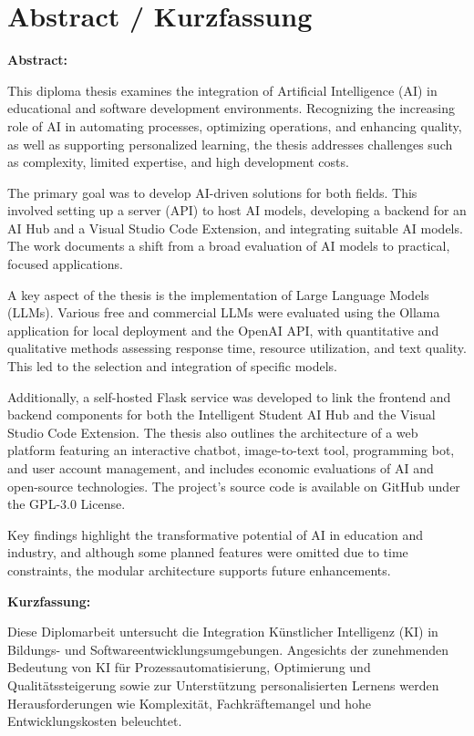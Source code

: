 

\small{\chapter*{Abstract / Kurzfassung}}
\label{cha:abstract}

\small{
\textbf{Abstract:}

This diploma thesis examines the integration of Artificial Intelligence (AI) in educational and software development environments. Recognizing the increasing role of AI in automating processes, optimizing operations, and enhancing quality, as well as supporting personalized learning, the thesis addresses challenges such as complexity, limited expertise, and high development costs.
    
The primary goal was to develop AI-driven solutions for both fields. This involved setting up a server (API) to host AI models, developing a backend for an AI Hub and a Visual Studio Code Extension, and integrating suitable AI models. The work documents a shift from a broad evaluation of AI models to practical, focused applications.
    
A key aspect of the thesis is the implementation of Large Language Models (LLMs). Various free and commercial LLMs were evaluated using the Ollama application for local deployment and the OpenAI API, with quantitative and qualitative methods assessing response time, resource utilization, and text quality. This led to the selection and integration of specific models.
    
Additionally, a self-hosted Flask service was developed to link the frontend and backend components for both the Intelligent Student AI Hub and the Visual Studio Code Extension. The thesis also outlines the architecture of a web platform featuring an interactive chatbot, image-to-text tool, programming bot, and user account management, and includes economic evaluations of AI and open-source technologies. The project’s source code is available on GitHub under the GPL-3.0 License.
    
Key findings highlight the transformative potential of AI in education and industry, and although some planned features were omitted due to time constraints, the modular architecture supports future enhancements.

\newpage

\textbf{Kurzfassung:}
    
Diese Diplomarbeit untersucht die Integration Künstlicher Intelligenz (KI) in Bildungs- und Softwareentwicklungsumgebungen. Angesichts der zunehmenden Bedeutung von KI für Prozessautomatisierung, Optimierung und Qualitätssteigerung sowie zur Unterstützung personalisierten Lernens werden Herausforderungen wie Komplexität, Fachkräftemangel und hohe Entwicklungskosten beleuchtet.
    
}

